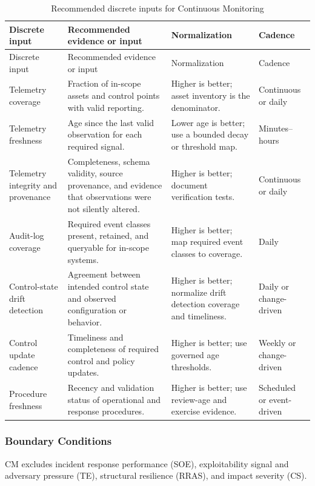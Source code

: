 \documentclass[11pt]{article}
\begin{document}
\begin{longtable}{P{0.18\textwidth} P{0.35\textwidth} P{0.18\textwidth} P{0.17\textwidth}}
  \caption{Recommended discrete inputs for Continuous Monitoring}\\
  \toprule
  Discrete input & Recommended evidence or input & Normalization & Cadence \\
  \midrule
  \endfirsthead
  \toprule
  Discrete input & Recommended evidence or input & Normalization & Cadence \\
  \midrule
  \endhead
  Telemetry coverage & Fraction of in-scope assets and control points with valid reporting. & Higher is better; asset inventory is the denominator. & Continuous or daily \\
  Telemetry freshness & Age since the last valid observation for each required signal. & Lower age is better; use a bounded decay or threshold map. & Minutes--hours \\
  Telemetry integrity and provenance & Completeness, schema validity, source provenance, and evidence that observations were not silently altered. & Higher is better; document verification tests. & Continuous or daily \\
  Audit-log coverage & Required event classes present, retained, and queryable for in-scope systems. & Higher is better; map required event classes to coverage. & Daily \\
  Control-state drift detection & Agreement between intended control state and observed configuration or behavior. & Higher is better; normalize drift detection coverage and timeliness. & Daily or change-driven \\
  Control update cadence & Timeliness and completeness of required control and policy updates. & Higher is better; use governed age thresholds. & Weekly or change-driven \\
  Procedure freshness & Recency and validation status of operational and response procedures. & Higher is better; use review-age and exercise evidence. & Scheduled or event-driven \\
  \bottomrule
\end{longtable}

\subsubsection{Boundary Conditions}
CM excludes incident response performance (SOE), exploitability signal and adversary
pressure (TE), structural resilience (RRAS), and impact severity (CS).
\end{document}

